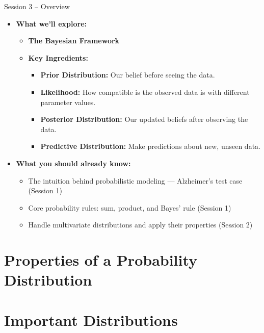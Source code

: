 \documentclass{beamer}
\begin{document}
\begin{frame}{Session 3 – Overview}
  \begin{itemize}
    \item \textbf{What we’ll explore:}
    \begin{itemize}
      \item \textbf{The Bayesian Framework}
      \item \textbf{Key Ingredients:}
      \begin{itemize}
        \item \textbf{Prior Distribution:} Our belief before seeing the data.
        \item \textbf{Likelihood:} How compatible is the observed data is with different parameter values.
        \item \textbf{Posterior Distribution:} Our updated beliefs after observing the data.
        \item \textbf{Predictive Distribution:} Make predictions about new, unseen data.
      \end{itemize}
    \end{itemize}

    \item \textbf{What you should already know:}
    \begin{itemize}
      \item The intuition behind probabilistic modeling — Alzheimer’s test case (Session 1)
      \item Core probability rules: sum, product, and Bayes' rule (Session 1)
      \item Handle multivariate distributions and apply their properties (Session 2)
    \end{itemize}
  \end{itemize}
\end{frame}

\section{Properties of a Probability Distribution}

\section{Important Distributions}
\end{document}
